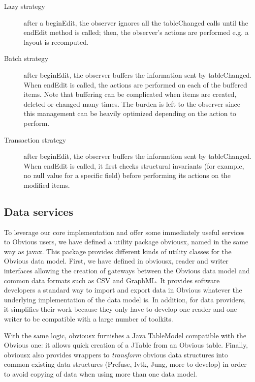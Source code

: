\begin{description}
\item[Lazy strategy] after a beginEdit, the observer ignores all the
  tableChanged calls until the endEdit method is called; then, the
  observer's actions are performed e.g. a layout is recomputed.

\item[Batch strategy] after beginEdit, the observer buffers the
  information sent by tableChanged.  When endEdit is called, the
  actions are performed on each of the buffered items.  Note that 
  buffering can be complicated when items are created, deleted or
  changed many times.  The burden is left to the observer since this
  management can be heavily optimized depending on the action to
  perform.

\item[Transaction strategy] after beginEdit, the observer buffers the
  information sent by tableChanged.  When endEdit is called, it first
  checks structural invariants (for example, no null value for a
  specific field) before performing its actions on the modified items.
\end{description}

\subsection{Data services}

To leverage our core implementation and offer some immediately useful
services to Obvious users, we have defined a utility package obviousx,
named in the same way as javax. This package provides different kinds
of utility classes for the Obvious data model. First, we have defined
in obviousx, reader and writer interfaces allowing the creation of
gateways between the Obvious data model and common data formats such
as CSV and GraphML. It provides software developers a standard way to
import and export data in Obvious whatever the underlying
implementation of the data model is. In addition, for data providers,
it simplifies their work because they only have to develop one reader
and one writer to be compatible with a large number of toolkits.

With the same logic, obviousx furnishes a Java TableModel compatible with the Obvious one: it allows quick creation of a JTable from an Obvious
table. Finally, obviousx also provides wrappers to \emph{transform} obvious data structures into common existing data structures (Prefuse, Ivtk, Jung, more to develop) in order to avoid copying of data when using more than one data model.
